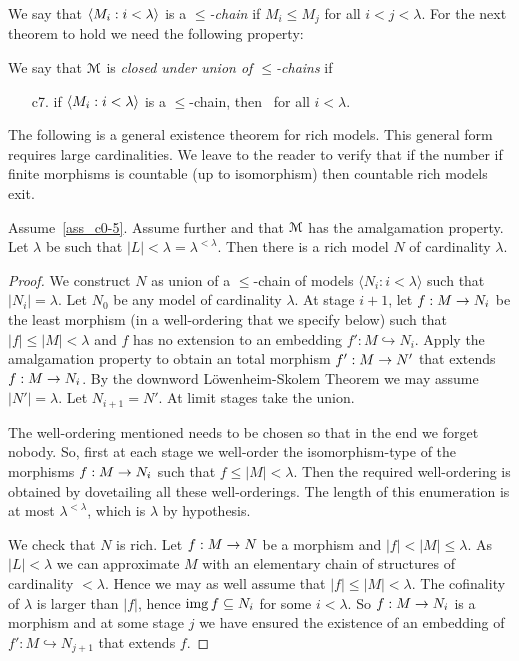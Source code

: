 \documentclass[creche.tex]{subfiles}
\begin{document}
We say that $\langle M_i:i<\lambda\rangle$ is a \emph{$\le$-chain\/} if $M_i\le M_j$ for all $i<j<\lambda$. For the next theorem to hold we need the following property:

\begin{definition}
We say that $\EuScript M$ is \emph{closed under union of $\le$-chains\/} if
\begin{itemize}
\item[c7.] if $\langle M_i:i<\lambda\rangle$ is a $\le$-chain,  then  \ for all $i<\lambda$.\QED
\end{itemize}
\end{definition}

The following is a general existence theorem for rich models. This general form requires large cardinalities. We leave to the reader to verify that if the number if finite morphisms is countable (up to isomorphism) then countable rich models exit.

\begin{theorem}  Assume~\ref{ass_c0-5}. Assume further  and that $\EuScript M$ has the amalgamation property. Let $\lambda$ be such that $|L|<\lambda=\lambda^{<\lambda}$.  Then there is a rich model $N$ of cardinality $\lambda$.
\end{theorem}

\begin{proof} We construct $N$ as union of a $\le$-chain of models $\langle N_i:i < \lambda\rangle$ such that $|N_i| = \lambda$. Let $N_0$ be any model of cardinality $\lambda$. At stage $i+1$, let $f:M\rightarrow N_i$ be the least morphism (in a well-ordering that we specify below) such that $|f|\le|M|<\lambda$ and $f$ has no extension to an embedding $f':M\hookrightarrow N_i$. Apply the amalgamation property to obtain an total morphism $f':M\rightarrow N'$ that extends $f:M\rightarrow N_i$. By the downword L\"owenheim-Skolem Theorem we may assume $|N'|=\lambda$. Let $N_{i+1}=N'$. At limit stages take the union.

The well-ordering mentioned needs to be chosen so that in the end we forget nobody. So, first at each stage we well-order the isomorphism-type of the morphisms $f:M\rightarrow N_i$ such that  $f\le|M|<\lambda$. Then the required well-ordering is obtained by dovetailing all these well-orderings.  The length of this enumeration is at most $\lambda^{<\lambda}$, which is $\lambda$ by hypothesis.

We check that $N$ is rich. Let $f:M\rightarrow N$ be a morphism and $|f|<|M|\le\lambda$. As $|L|<\lambda$ we can approximate $M$ with an elementary chain of structures of cardinality $<\lambda$. Hence we may as well assume that $|f|\le|M|<\lambda$. The cofinality of $\lambda$ is larger than $|f|$, hence $\mathop{\rm img} f\subseteq N_i$ for some $i<\lambda$. So $f:M\rightarrow N_i$ is a morphism and at some stage $j$ we have ensured the existence of an embedding of $f':M\hookrightarrow N_{j+1}$ that extends $f$.
\end{proof}
\end{document}
